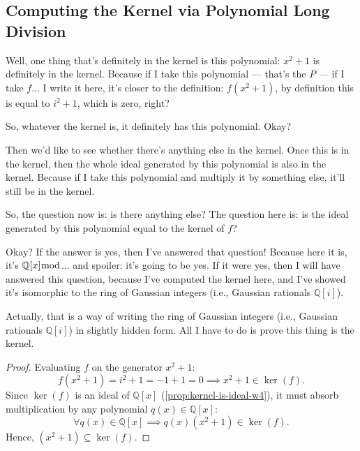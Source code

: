 \subsection{Computing the Kernel via Polynomial Long Division}

\begin{speech}[01:24:50 - 01:26:25]
Well, one thing that's definitely in the kernel is this polynomial: $x^2 + 1$ is definitely in the kernel.  Because if I take this polynomial --- that's the $P$ --- if I take $f$... I write it here, it's closer to the definition: $f(x^2 + 1)$, by definition this is equal to $i^2 + 1$, which is zero,  right? 

So, whatever the kernel is, it definitely has this polynomial. Okay? 

Then we'd like to see whether there's anything else in the kernel. Once this is in the kernel, then the whole ideal generated by this polynomial is also in the kernel.  Because if I take this polynomial and multiply it by something else, it'll still be in the kernel. 

So, the question now is: is there anything else? The question here is: is the ideal generated by this polynomial equal to the kernel of $f$?  

Okay? If the answer is yes, then I've answered that question! Because here it is, it's $\mathbb{Q}[x] \bmod$... and spoiler: it's going to be yes. If it were yes, then I will have answered this question, because I've computed the kernel here, and I've showed it's isomorphic to the ring of Gaussian integers (i.e., Gaussian rationals $\mathbb{Q}[i]$). 

Actually, that is a way of writing the ring of Gaussian integers (i.e., Gaussian rationals $\mathbb{Q}[i]$) in slightly hidden form. All I have to do is prove this thing is the kernel.
\end{speech}

\begin{content}

\begin{proof}
Evaluating $f$ on the generator $x^2 + 1$:
\[
f(x^2 + 1) = i^2 + 1 = -1 + 1 = 0 \implies x^2 + 1 \in \ker(f).
\]
Since $\ker(f)$ is an ideal of $\mathbb{Q}[x]$ (\cref{prop:kernel-is-ideal-w4}), it must absorb multiplication by any polynomial $q(x) \in \mathbb{Q}[x]$:
\[
\forall q(x) \in \mathbb{Q}[x] \implies q(x)(x^2 + 1) \in \ker(f).
\]
Hence, $(x^2 + 1) \subseteq \ker(f)$.
\end{proof}
\end{content}

